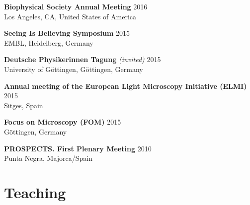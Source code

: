 \documentclass[margin,line]{res}
\begin{document}
\begin{resume}
\vspace*{-2.5mm}
{\bf Biophysical Society Annual Meeting}  \hfill 2016\\
Los Angeles, CA, United States of America

\vspace*{-2.5mm}
{\bf Seeing Is Believing Symposium}  \hfill 2015\\
EMBL, Heidelberg, Germany

\vspace*{-2.5mm}
{\bf Deutsche Physikerinnen Tagung} {\it (invited)}  \hfill 2015\\
University of Göttingen, Göttingen, Germany

\vspace*{-2.5mm}
{\bf Annual meeting of the European Light Microscopy Initiative (ELMI)}  \hfill 2015\\
Sitges, Spain%

\vspace*{-2.5mm}
{\bf Focus on Microscopy (FOM)}  \hfill 2015\\
Göttingen, Germany

\vspace*{-2.5mm}
{\bf PROSPECTS. First Plenary Meeting}   \hfill 2010\\
Punta Negra, Majorca/Spain

\clearpage


\section{\sc Teaching}


\end{resume}
\end{document}
